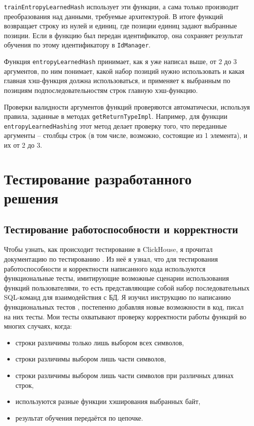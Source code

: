 \documentclass[a4paper,12pt]{extarticle}
\begin{document}
\begin{sloppypar}
\texttt{trainEntropyLearnedHash} использует эти функции, а сама только производит преобразования над данными, требуемые архитектурой. В итоге функций возвращает строку из нулей и единиц, где позиции единиц задают выбранные позиции. Если в функцию был передан идентификатор, она сохраняет результат обучения по этому идентификатору в \texttt{IdManager}.

Функция \texttt{entropyLearnedHash} принимает, как я уже написал выше, от 2 до 3 аргументов, по ним понимает, какой набор позиций нужно использовать и какая главная хэш-функция должна использоваться, и применяет к выбранным по позициям подпоследовательностям строк главную хэш-функцию.

Проверки валидности аргументов функций проверяются автоматически, используя правила, заданные в методах \texttt{getReturnTypeImpl}. Например, для функции \texttt{entropyLearnedHashing} этот метод делает проверку того, что переданные аргументы -- столбцы строк (в том числе, возможно, состоящие из 1 элемента), и их от 2 до 3.

\newpage

\section{Тестирование разработанного решения}
\subsection{Тестирование работоспособности и корректности}
Чтобы узнать, как происходит тестирование в ClickHouse, я прочитал документацию по тестированию \cite{clickhouse_testing}. Из неё я узнал, что для тестирования работоспособности и корректности написанного кода используются функциональные тесты, имитирующие возможные сценарии использования функций пользователями, то есть представляющие собой набор последовательных SQL-команд для взаимодействия с БД. Я изучил инструкцию по написанию функциональных тестов \cite{clickhouse_sql_test_queries}, постепенно добавляя новые возможности в код, писал на них тесты. Мои тесты охватывают проверку корректности работы функций во многих случаях, когда:

\begin{itemize}
	\item строки различимы только лишь выбором всех символов,
	\item строки различимы выбором лишь части символов,
	\item строки различимы выбором лишь части символов при различных длинах строк,
	\item используются разные функции хэширования выбранных байт,
	\item результат обучения передаётся по цепочке.
\end{itemize}


\end{sloppypar}
\end{document}
